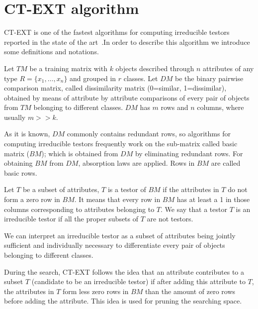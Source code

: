 \documentclass[authoryear,preprint,review,12pt]{elsarticle}
\begin{document}
\section{CT-EXT algorithm}
\label{sect:2}
CT-EXT is one of the fastest algorithms for computing irreducible testors reported in the 
state of the art~\citep{R22,R23,Piza13}.In order to describe this algorithm we introduce some definitions 
and notations.


Let $TM$ be a training matrix with $k$ objects described through $n$
attributes of any type $R=\{x_{1},\ldots,x_{n}\}$ and grouped in $r$
classes. Let $DM$ be the binary pairwise comparison matrix, called dissimilarity matrix 
(0=similar, 1=dissimilar), obtained by means of attribute by attribute comparisons of every
pair of objects from $TM$ belonging to different classes. $DM$ has
$m$ rows and $n$ columns, where usually $m>>k$.

As it is known, $DM$ commonly contains redundant rows, so algorithms
for computing irreducible testors frequently work on the sub-matrix called basic matrix ($BM$);
which is obtained from $DM$ by eliminating redundant rows. For obtaining
$BM$ from $DM$, absorption laws are applied. Rows in $BM$ are called basic rows.

Let $T$ be a subset of attributes, $T$ is a testor of $BM$ if the attributes in $T$ do not form a zero row 
in $BM$. It means that every row in $BM$ has at least a 1 in those columns corresponding to attributes 
belonging to $T$. We say that a testor $T$ is an irreducible testor if all the proper subsets of $T$ are not testors.

We can interpret an irreducible testor as a subset of attributes being jointly sufficient and individually necessary
to differentiate every pair of objects belonging to different classes.


During the search, CT-EXT follows the idea that an attribute contributes to a subset $T$ (candidate to 
be an irreducible testor) if after adding this attribute to $T$, the attributes in $T$ form less zero rows in $BM$ than 
the amount of zero rows before adding the attribute. This idea is used for pruning the searching space.
\end{document}
